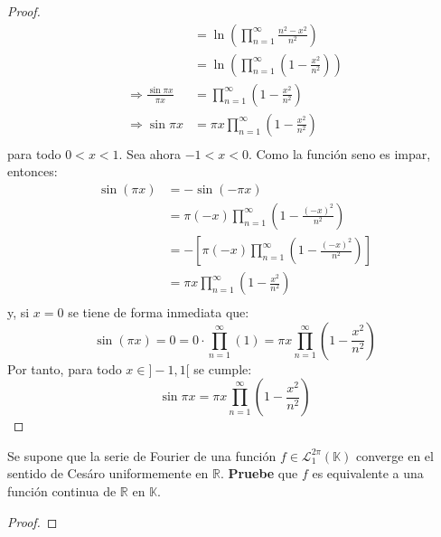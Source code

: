\documentclass[12pt]{report}
\theoremstyle{largebreak}
\begin{document}
\begin{proof}
\begin{equation*}
\begin{split}
                &=\ln\left(\prod_{ n=1}^\infty\frac{n^2-x^2}{n^2}\right)\\
                &=\ln\left(\prod_{ n=1}^\infty\left(1-\frac{x^2}{n^2}\right) \right)\\
                \Rightarrow \frac{\sin \pi x}{\pi x}&=\prod_{ n=1}^\infty\left(1-\frac{x^2}{n^2}\right)\\
                \Rightarrow \sin\pi x&=\pi x\prod_{ n=1}^\infty\left(1-\frac{x^2}{n^2}\right)\\
            \end{split}
        \end{equation*}
        para todo $0<x<1$. Sea ahora $-1<x<0$. Como la función seno es impar, entonces:
        \begin{equation*}
            \begin{split}
                \sin(\pi x)&=-\sin(-\pi x)\\
                &=\pi (-x)\prod_{ n=1}^\infty\left(1-\frac{(-x)^2}{n^2}\right)\\
                &=-\left[\pi (-x)\prod_{ n=1}^\infty\left(1-\frac{(-x)^2}{n^2}\right)\right] \\
                &=\pi x\prod_{ n=1}^\infty\left(1-\frac{x^2}{n^2}\right)\\
            \end{split}
        \end{equation*}
        y, si $x=0$ se tiene de forma inmediata que:
        \begin{equation*}
            \sin(\pi x)=0=0\cdot\prod_{ n=1}^\infty\left(1\right)=\pi x\prod_{ n=1}^\infty\left(1-\frac{x^2}{n^2}\right)
        \end{equation*}
        Por tanto, para todo $x\in]-1,1[$ se cumple:
        \begin{equation*}
            \sin\pi x=\pi x\prod_{ n=1}^\infty\left(1-\frac{x^2}{n^2}\right)
        \end{equation*}
    \end{proof}

    \begin{excer}
        Se supone que la serie de Fourier de una función $f\in\mathcal{L}_1^{2\pi}(\mathbb{K})$ converge en el sentido de Cesáro uniformemente en $\mathbb{R}$. \textbf{Pruebe} que $f$ es equivalente a una función continua de $\mathbb{R}$ en $\mathbb{K}$.
    \end{excer}

    \begin{proof}
    \end{proof}
\end{document}
